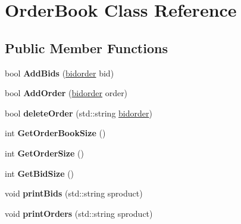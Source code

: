 \hypertarget{classOrderBook}{}\section{Order\+Book Class Reference}
\label{classOrderBook}
\subsection*{Public Member Functions}
\begin{DoxyCompactItemize}
\item 
bool {\bfseries Add\+Bids} (\hyperlink{structbidorder}{bidorder} bid)\hypertarget{classOrderBook_a7c7230f821d4cd18b6b7c809ec21e0a7}{}\label{classOrderBook_a7c7230f821d4cd18b6b7c809ec21e0a7}

\item 
bool {\bfseries Add\+Order} (\hyperlink{structbidorder}{bidorder} order)\hypertarget{classOrderBook_a88466bcea74c0152835325d59ae80846}{}\label{classOrderBook_a88466bcea74c0152835325d59ae80846}

\item 
bool {\bfseries delete\+Order} (std\+::string \hyperlink{structbidorder}{bidorder})\hypertarget{classOrderBook_ab7daea398fbcbde673f55de017d0c110}{}\label{classOrderBook_ab7daea398fbcbde673f55de017d0c110}

\item 
int {\bfseries Get\+Order\+Book\+Size} ()\hypertarget{classOrderBook_a4cfafb8016e8c9ab3729afc8d07a5964}{}\label{classOrderBook_a4cfafb8016e8c9ab3729afc8d07a5964}

\item 
int {\bfseries Get\+Order\+Size} ()\hypertarget{classOrderBook_a543bde05403477fd92363e87b46121f7}{}\label{classOrderBook_a543bde05403477fd92363e87b46121f7}

\item 
int {\bfseries Get\+Bid\+Size} ()\hypertarget{classOrderBook_af2ff87414ce6d6be83da6de8e69580f7}{}\label{classOrderBook_af2ff87414ce6d6be83da6de8e69580f7}

\item 
void {\bfseries print\+Bids} (std\+::string sproduct)\hypertarget{classOrderBook_add4580b31619361e905876be1ea8355a}{}\label{classOrderBook_add4580b31619361e905876be1ea8355a}

\item 
void {\bfseries print\+Orders} (std\+::string sproduct)\hypertarget{classOrderBook_a765227b7d01d1810cc7c0f84c0d9695a}{}\label{classOrderBook_a765227b7d01d1810cc7c0f84c0d9695a}

\end{DoxyCompactItemize}
